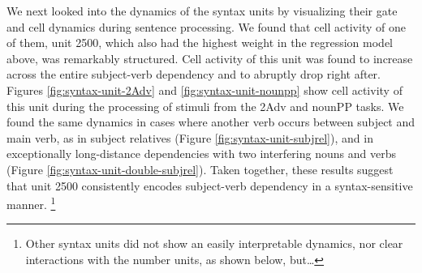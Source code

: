 We next looked into the dynamics of the syntax units by visualizing
their gate and cell dynamics during sentence processing. We found that
cell activity of one of them, unit \unit{2}{500},
which also had the highest weight in the regression model above, was
remarkably structured. Cell activity of this unit was found to
increase across the entire subject-verb dependency and to abruptly
drop right after. Figures \ref{fig:syntax-unit-2Adv} and
\ref{fig:syntax-unit-nounpp} show cell activity of this unit during
the processing of stimuli from the 2Adv and nounPP tasks. We found the
same dynamics in cases where another verb occurs between subject and
main verb, as in subject relatives (Figure
\ref{fig:syntax-unit-subjrel}), and in exceptionally long-distance
dependencies with two interfering nouns and verbs (Figure
\ref{fig:syntax-unit-double-subjrel}). Taken together, these results
suggest that unit \unit{2}{500} consistently encodes
subject-verb dependency in a syntax-sensitive manner. 
\footnote{Other syntax units did not show an easily interpretable
  dynamics, nor clear interactions with the number units, as shown below, but\ldots}

